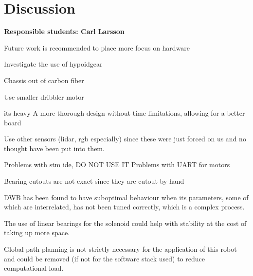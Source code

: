 \section{Discussion}
\label{section:discussion}


\textbf{Responsible students: Carl Larsson}



Future work is recommended to place more focus on hardware

Investigate the use of hypoidgear

Chassis out of carbon fiber

Use smaller dribbler motor

its heavy
A more thorough design without time limitations, allowing for a better board

Use other sensors (lidar, rgb especially) since these were just forced on us and no thought have been put into them. 

Problems with stm ide, DO NOT USE IT
Problems with UART for motors

Bearing cutouts are not exact since they are cutout by hand

DWB has been found to have suboptimal behaviour when its parameters, some of which are interrelated, has not been tuned correctly, which is a complex process\:\cite{macenski_desks_2023}.

The use of linear bearings for the solenoid could help with stability at the cost of taking up more space\:\cite{chen_zjunlict_2018}.

Global path planning is not strictly necessary for the application of this robot and could be removed (if not for the software stack used) to reduce computational load.

